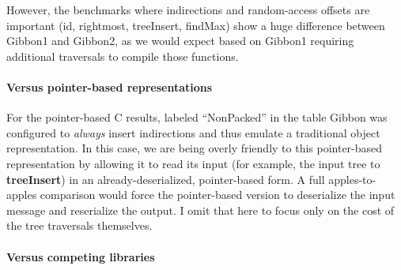However, the benchmarks where indirections and random-access offsets are important (id,
rightmost, treeInsert, findMax) show a huge difference between Gibbon1 and Gibbon2,
as we would expect based on Gibbon1
requiring additional traversals to compile those functions.

\paragraph{Versus pointer-based representations}
For the pointer-based C results, labeled ``NonPacked'' in the table
Gibbon was configured to \emph{always} insert indirections
and thus emulate a traditional object representation.
%
In this case, we are being overly friendly to this pointer-based representation by
allowing it to read its input (for example, the input tree to {\bf treeInsert})
in an already-deserialized, pointer-based form.  A full apples-to-apples
comparison would force the pointer-based version to deserialize the input
message and reserialize the output. I omit that here to focus only on the
cost of the tree traversals themselves.
%

\paragraph{Versus competing libraries}


